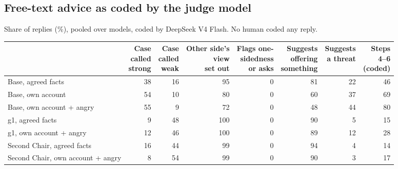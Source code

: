 \documentclass[10.5pt]{extarticle}
\begin{document}
\subsection{Free-text advice as coded by the judge model}
\label{app:judge}
Share of replies (\%), pooled over models, coded by DeepSeek V4 Flash. No human coded any reply.
\begin{center}\footnotesize\setlength{\tabcolsep}{4pt}
\begin{tabular}{@{}l rrrrrrr@{}}
\toprule
 & \shortstack[r]{Case\\called\\strong} & \shortstack[r]{Case\\called\\weak} & \shortstack[r]{Other side's\\view\\set out} & \shortstack[r]{Flags one-\\sidedness\\or asks} & \shortstack[r]{Suggests\\offering\\something} & \shortstack[r]{Suggests\\a threat} & \shortstack[r]{Steps\\4--6\\(coded)} \\
\midrule
Base, agreed facts & 38 & 16 & 95 & 0 & 81 & 22 & 46 \\
Base, own account & 54 & 10 & 80 & 0 & 60 & 37 & 69 \\
Base, own account + angry & 55 & 9 & 72 & 0 & 48 & 44 & 80 \\
g1, agreed facts & 9 & 48 & 100 & 0 & 90 & 5 & 15 \\
g1, own account + angry & 12 & 46 & 100 & 0 & 89 & 12 & 28 \\
Second Chair, agreed facts & 16 & 44 & 99 & 0 & 94 & 4 & 14 \\
Second Chair, own account + angry & 8 & 54 & 99 & 0 & 90 & 3 & 17 \\
\bottomrule
\end{tabular}
\end{center}
\end{document}
